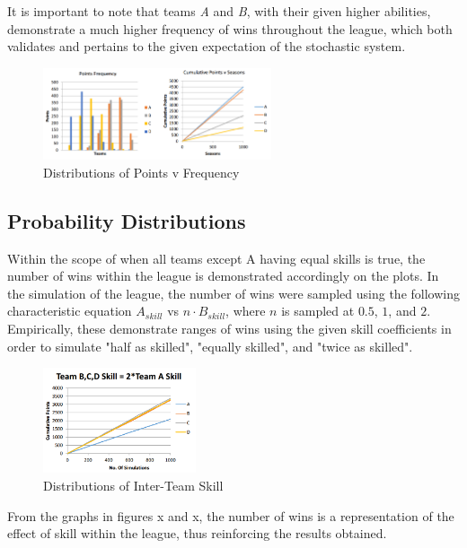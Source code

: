 \documentclass[12pt]{article}
\begin{document}
It is important to note that teams \emph{A} and \emph{B}, with their given higher abilities, demonstrate a much higher frequency of wins throughout the league, which both validates and pertains to the given expectation of the stochastic system.

\begin{figure}[h]
\centering
\includegraphics[width=0.6\textwidth]{q1ii_graphs.png}
\caption{Distributions of Points v Frequency}
\end{figure}

\subsection{Probability Distributions}
Within the scope of when all teams except A having equal skills is true, the number of wins within the league is demonstrated accordingly on the plots. In the simulation of the league, the number of wins were sampled using the following characteristic equation $A_{skill}$ vs $n \cdot B_{skill}$, where $n$ is sampled at $0.5$, $1$, and $2$. Empirically, these demonstrate ranges of wins using the given skill coefficients in order to simulate "half as skilled", "equally skilled", and "twice as skilled".

\begin{figure}[H]
\centering
\includegraphics[width=0.4\textwidth]{twice_skill_a.png}
\caption{Distributions of Inter-Team Skill}
\end{figure}

From the graphs in figures x and x, the number of wins is a representation of the effect of skill within the league, thus reinforcing the results obtained.
\end{document}
